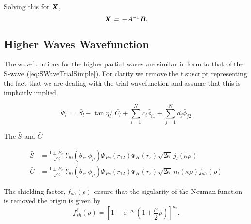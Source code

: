 \documentclass[preprint,showpacs,preprintnumbers,amsmath,amssymb]{revtex4}
\newcommand{\ee} {\,\text{e}}
\newcommand{\beq}{\begin{equation}}
\newcommand{\eeq}{\end{equation}}
\begin{document}
\noindent Solving this for $\textbf{\emph{X}}$,
\beq
\textbf{\emph{X = $-A^{-1}$B}}.
\eeq


\subsection{Higher Waves Wavefunction}
The  wavefunctions for the higher partial waves are similar in form to that of the S-wave (\ref{eq:SWaveTrialSimple}). For clarity we remove the t suscript representing the fact that we are dealing with the trial wavefunction and assume that this is implicitly implied.

\begin{equation}
\Psi_l^\pm = \bar{S_l} + \tan \eta_l^\pm \, \bar{C_l} + \sum_{i=1}^N c_i \bar{\phi}_{i1} + \sum_{j=1}^N d_j \bar{\phi}_{j2}
\label{eq:PWaveSimple}
\end{equation}

\noindent The $\bar{S}$ and $\bar{C}$ 

\begin{subequations}
\label{eq:PartialWaveSandCBar}
\begin{align}
\bar{S} &= \frac{1\pm P_{23}}{\sqrt{2}}Y_{l0}(\theta_\rho,\phi_\rho)\Phi_{Ps}\left(r_{12}\right) \Phi_H\left(r_3\right) \sqrt{2\kappa} \,j_l\left(\kappa\rho\right) \label{eq:PWaveSBar} \\
\bar{C} &=\frac{1\pm P_{23}}{\sqrt{2}}Y_{l0}(\theta_\rho,\phi_\rho)\Phi_{Ps}\left(r_{12}\right) \Phi_H\left(r_3\right) \sqrt{2\kappa} \,n_l\left(\kappa\rho\right) f_{sh}(\rho) \label{eq:PWaveCBar} 
\end{align}
\end{subequations}




\noindent The shielding factor, $f_{sh}(\rho)$ ensure that the sigularity of the Neuman function is removed the origin is given by
\beq
f^\ell_{sh}(\rho) = \left[1 - \ee^{-\mu \rho} \left(1+\frac{\mu}{2}\rho\right)\right]^{n_\ell}.
\label{eq:PartialWaveShielding}
\eeq
\end{document}
